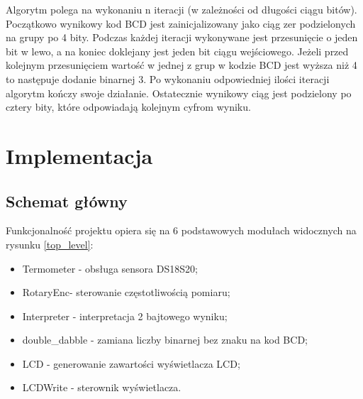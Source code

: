 \documentclass[a4paper]{article}
\begin{document}
Algorytm polega na wykonaniu n iteracji (w zależności od długości ciągu bitów). Początkowo wynikowy kod BCD jest zainicjalizowany jako ciąg zer podzielonych na grupy po 4 bity. Podczas każdej iteracji wykonywane jest przesunięcie o jeden bit w lewo, a na koniec doklejany jest jeden bit ciągu wejściowego. Jeżeli przed kolejnym przesunięciem wartość w jednej z grup w kodzie BCD jest wyższa niż 4 to następuje dodanie binarnej 3. Po wykonaniu odpowiedniej ilości iteracji algorytm kończy swoje działanie. Ostatecznie wynikowy ciąg jest podzielony po cztery bity, które odpowiadają kolejnym cyfrom wyniku. 

\section{Implementacja}

\subsection{Schemat główny}

Funkcjonalność projektu opiera się na 6 podstawowych modułach widocznych na rysunku \ref{top_level}:
\begin{itemize}
\item Termometer - obsługa sensora DS18S20;
\item RotaryEnc- sterowanie częstotliwością pomiaru;
\item Interpreter - interpretacja 2 bajtowego wyniku;
\item double\_dabble - zamiana liczby binarnej bez znaku na kod BCD;
\item LCD - generowanie zawartości wyświetlacza LCD;
\item LCDWrite - sterownik wyświetlacza.
\end{itemize}
\end{document}
